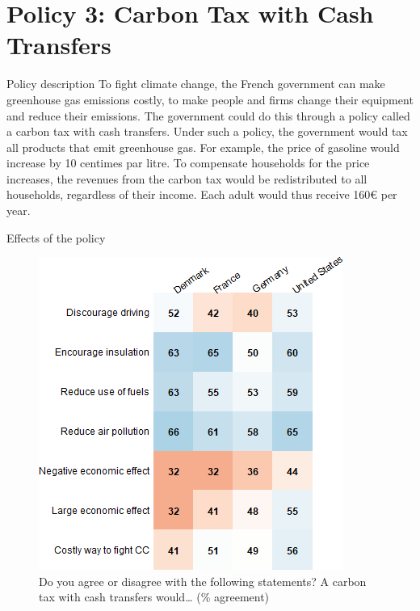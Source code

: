 \documentclass[aspectratio=169,9pt,dvipsnames]{beamer}
\begin{document}
\section{Policy 3: Carbon Tax with Cash Transfers}


\begin{frame}{Policy description}%
To fight climate change, the French government can make greenhouse gas emissions costly, to make people and firms change their equipment and reduce their emissions. The government could do this through a policy called a carbon tax with cash transfers. Under such a policy, the government would tax all products that emit greenhouse gas. For example, the price of gasoline would increase by 10 centimes par litre. To compensate households for the price increases, the revenues from the carbon tax would be redistributed to all households, regardless of their income. Each adult would thus receive 160\euro{} per year.
\end{frame}

\begin{frame}{Effects of the policy}%


\begin{figure}[h!]
\centering
\caption{Do you agree or disagree with the following statements? A carbon tax with cash transfers would… (\% agreement)}
\includegraphics[width=.4\textwidth]{../figures/country_comparison/tax_transfers_effect_positive_countries.png}
\end{figure}
\end{frame}
\end{document}

